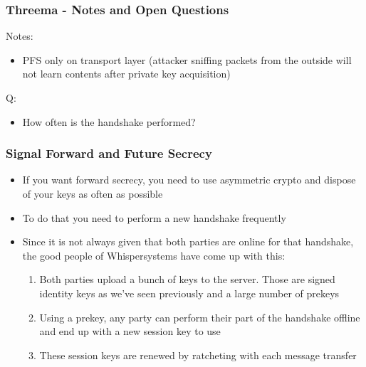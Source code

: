 \documentclass[
	aspectratio=169,
	xetex,
]{beamer}
\begin{document}
\begin{frame}
	\frametitle{Threema - Notes and Open Questions}
	Notes:
	\begin{itemize}
		\item PFS only on transport layer (attacker sniffing packets from the outside will not learn contents after private key acquisition)
	\end{itemize}
	Q:
	\begin{itemize}
		\item How often is the handshake performed?
	\end{itemize}
\end{frame}


\begin{frame}
	\frametitle{Signal Forward and Future Secrecy}
	\begin{itemize}
		\item If you want forward secrecy, you need to use asymmetric crypto and dispose of your keys as often as possible
		\item To do that you need to perform a new handshake frequently
		\item Since it is not always given that both parties are online for that handshake, the good people of Whispersystems have come up with this:
			\begin{enumerate}
				\item Both parties upload a bunch of keys to the server. Those are signed identity keys as we've seen previously and a large number of \alert{prekeys}
				\item Using a prekey, any party can perform their part of the handshake offline and end up with a new session key to use 
				\item These session keys are renewed by \alert{ratcheting} with each message transfer
			\end{enumerate}
	\end{itemize}
\end{frame}
\end{document}
